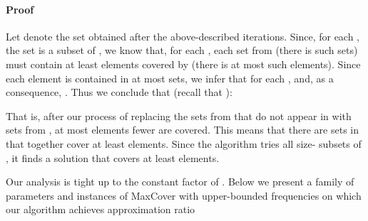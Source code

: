 \documentclass[11pt]{article}
\newenvironment{proof}{\paragraph{Proof}}{\hfill\medskip}
\begin{document}
\begin{proof}
  Let  denote the set obtained after the
  above-described  iterations. Since, for each , the set
   is a subset of , we know
  that, for each , each set from  (there is
   such sets) must contain at least 
  elements covered by  (there is at most
   such elements).  Since each element is contained in at most
   sets, we infer that for each ,  and, as a consequence, .  Thus we
  conclude that (recall that ):
  
  That is, after our process of replacing the sets from  that
  do not appear in  with sets from , at most
   elements fewer are covered. This means that there
  are  sets in  that together cover at least 
  elements. Since the algorithm tries all size- subsets of ,
  it finds a solution that covers at least  elements.~
\end{proof}


Our analysis is tight up to the constant factor of .
Below we present a family of parameters  and instances of
MaxCover with upper-bounded frequencies on which our algorithm
achieves approximation ratio 
\end{document}
